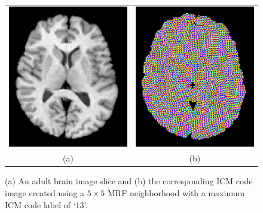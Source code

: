 \documentclass[11pt,english]{article}
\begin{document}
\begin{description}
\begin{figure}
\begin{center}
\begin{tabular}{cc}
\includegraphics[width=70mm]{r16slice.png} &
\includegraphics[width=70mm]{r16icm.png} \\
(a) & (b) \\
\end{tabular}
\end{center}
\caption{\baselineskip 12pt \small  (a) An adult brain image slice and (b) the corresponding ICM code image created using a $5\times5$ MRF neighborhood with a maximum ICM code label of `13'.  }
\label{fig:r16icm}
\end{figure}



\end{description}
\end{document}
